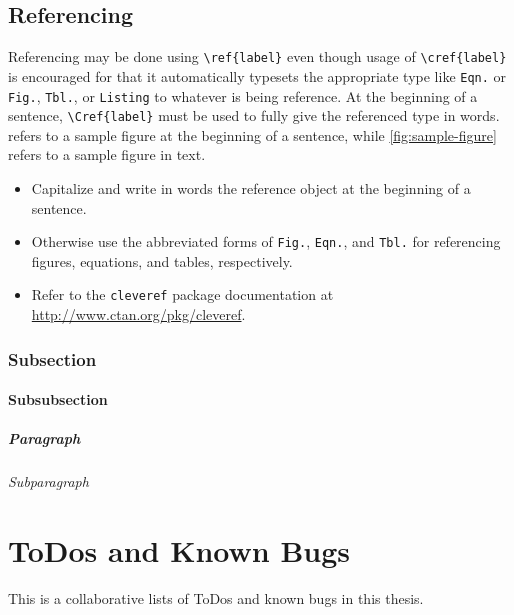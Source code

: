 \section{Referencing}\label{sec:referencing}

Referencing may be done using \lstinline!\ref{label}! even though usage of \lstinline!\cref{label}! is encouraged for that it automatically typesets the appropriate type like \texttt{Eqn.} or \texttt{Fig.}, \texttt{Tbl.}, or \texttt{Listing} to whatever is being reference. At the beginning of a sentence, \lstinline!\Cref{label}! must be used to fully give the referenced type in words.  refers to a sample figure at the beginning of a sentence, while \cref{fig:sample-figure} refers to a sample figure in text.

\begin{itemize}
    \item Capitalize and write in words the reference object at the beginning of a sentence.
    \item Otherwise use the abbreviated forms of \texttt{Fig.}, \texttt{Eqn.}, and \texttt{Tbl.} for referencing figures, equations, and tables, respectively.
    \item Refer to the \lstinline!cleveref! package documentation at \\\url{http://www.ctan.org/pkg/cleveref}.
\end{itemize}

\subsection{Subsection}

\subsubsection{Subsubsection}

\paragraph{Paragraph}

\subparagraph{Subparagraph}


\chapter{ToDos and Known Bugs}

\begin{intro}
    This is a collaborative lists of ToDos and known bugs in this thesis.%
\end{intro}

